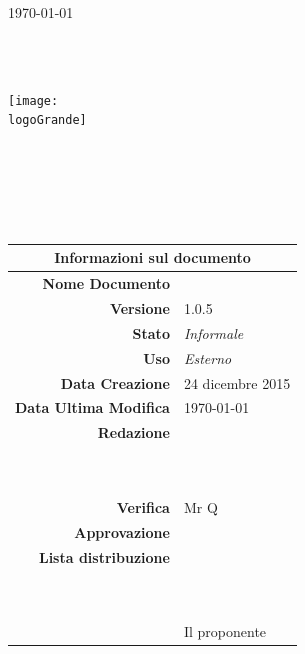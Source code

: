\documentclass[12pt,a4paper]{article}
\title{\titoloDocumento}
\newcommand{\titoloDocumento}{\PdP}
\newcommand{\dataCreazione}{24 dicembre 2015}
\newcommand{\versione}{1.0.5}
\newcommand{\stato}{Informale}
\newcommand{\uso}{Esterno}
\begin{document}
\begin{titlepage}
\begin{center}
\today \\
\vspace{1cm}
\begin{Huge}
\textbf{\nomeGruppo} \\
\end{Huge}
\textbf{\prjL} \\
\vspace{1cm}
\texttt{[image: \\logoGrande]}
\vspace{1cm}

\HRule \\[0.4cm]
\begin{Huge}
{\huge \bfseries \titoloDocumento}\\[0.4cm]
\end{Huge}
\HRule \\[1cm]
\vfill

\begin{table}[h]
\begin{center}
\begin{tabular}{r | l}
\multicolumn{2}{c}{\textbf{Informazioni sul documento}}\\
\midrule
\textbf{Nome Documento}	&	\titoloDocumento	\\
\textbf{Versione}	&	\versione	\\
\textbf{Stato}	&	\emph{\stato}	\\
\textbf{Uso}	&	\emph{\uso}	\\
\textbf{Data Creazione}	&	\dataCreazione	\\
\textbf{Data Ultima Modifica}	&	\today	\\
\textbf{Redazione}	& \NDC \\
\ 	& \TP \\
\ 	& \IB \\
\textbf{Verifica}	&	Mr Q	\\
\textbf{Approvazione}	& \NDC \\
\textbf{Lista distribuzione}	&	\nomeGruppo	\\
\ 	&	\Vardanega	\\
\ 	&	\Cardin	\\
\ 	&	Il proponente \Zucchetti	\\

\end{tabular}
\end{center}
\end{table}

\end{center}
\end{titlepage}
\newpage
\end{document}
